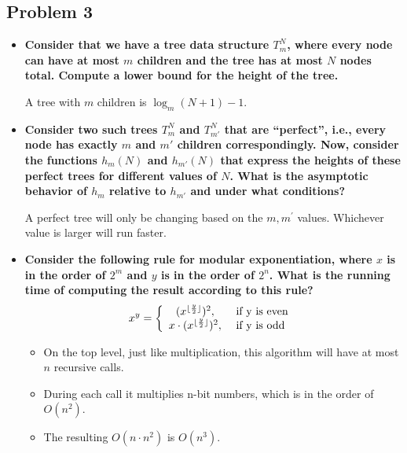 \documentclass[11pt]{article}
\begin{document}
\subsection*{Problem 3}
\begin{itemize}


\item \textbf{Consider that we have a tree data structure $T_m^N$, where every
  node can have at most $m$ children and the tree has at most $N$
  nodes total. Compute a lower bound for the height of the tree.}

A tree with $m$ children is $\log_{m}(N+1)-1$.

\item \textbf{Consider two such trees $T_m^N$ and $T_{m'}^N$ that are
  ``perfect'', i.e., every node has exactly $m$ and $m'$ children
  correspondingly. Now, consider the functions $h_m(N)$ and
  $h_{m'}(N)$ that express the heights of these perfect trees for
  different values of $N$. What is the asymptotic behavior of $h_m$
  relative to $h_{m'}$ and under what conditions?}

A perfect tree will only be changing based on the $m,m^\prime$ values. Whichever value is larger will run faster.

\item \textbf{Consider the following rule for modular exponentiation, where
  $x$ is in the order of $2^m$ and $y$ is in the order of $2^n$. What
  is the running time of computing the result according to this rule?
$$x^y = \left\{
\begin{array}{c l}     
    (x ^{\lfloor \frac{y}{2} \rfloor} )^2,  & \textrm{ if y is even }\\
    x \cdot (x^{\lfloor \frac{y}{2} \rfloor} )^2, & \textrm{ if y is odd}
\end{array}\right.$$
}

\begin{itemize}

\item On the top level, just like multiplication, this algorithm will have at most $n$ recursive calls.
\item During each call it multiplies n-bit numbers, which is in the order of $O(n^2)$.
\item The resulting $O(n \cdot n^2)$ is $O(n^3)$.

\end{itemize}

\end{itemize}
\end{document}

